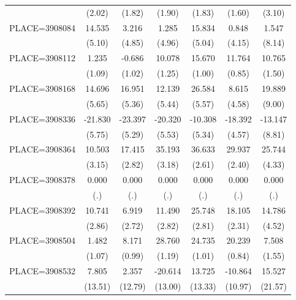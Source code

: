 {\begin{tabular}{l*{6}{c}}
                    &      (2.02)&      (1.82)&      (1.90)&      (1.83)&      (1.60)&      (3.10)\\
PLACE=3908084       &      14.535&       3.216&       1.285&      15.834&       0.848&       1.547\\
                    &      (5.10)&      (4.85)&      (4.96)&      (5.04)&      (4.15)&      (8.14)\\
PLACE=3908112       &       1.235&      -0.686&      10.078&      15.670&      11.764&      10.765\\
                    &      (1.09)&      (1.02)&      (1.25)&      (1.00)&      (0.85)&      (1.50)\\
PLACE=3908168       &      14.696&      16.951&      12.139&      26.584&       8.615&      19.889\\
                    &      (5.65)&      (5.36)&      (5.44)&      (5.57)&      (4.58)&      (9.00)\\
PLACE=3908336       &     -21.830&     -23.397&     -20.320&     -10.308&     -18.392&     -13.147\\
                    &      (5.75)&      (5.29)&      (5.53)&      (5.34)&      (4.57)&      (8.81)\\
PLACE=3908364       &      10.503&      17.415&      35.193&      36.633&      29.937&      25.744\\
                    &      (3.15)&      (2.82)&      (3.18)&      (2.61)&      (2.40)&      (4.33)\\
PLACE=3908378       &       0.000&       0.000&       0.000&       0.000&       0.000&       0.000\\
                    &         (.)&         (.)&         (.)&         (.)&         (.)&         (.)\\
PLACE=3908392       &      10.741&       6.919&      11.490&      25.748&      18.105&      14.786\\
                    &      (2.86)&      (2.72)&      (2.82)&      (2.81)&      (2.31)&      (4.52)\\
PLACE=3908504       &       1.482&       8.171&      28.760&      24.735&      20.239&       7.508\\
                    &      (1.07)&      (0.99)&      (1.19)&      (1.01)&      (0.84)&      (1.55)\\
PLACE=3908532       &       7.805&       2.357&     -20.614&      13.725&     -10.864&      15.527\\
                    &     (13.51)&     (12.79)&     (13.00)&     (13.33)&     (10.97)&     (21.57)\\

\end{tabular}}
